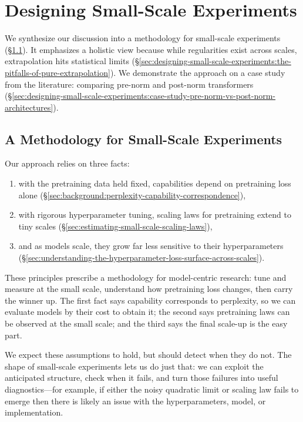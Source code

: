 \section{Designing Small-Scale Experiments}
\label{sec:designing-small-scale-experiments}

We synthesize our discussion into a methodology for small-scale experiments (\S\ref{sec:designing-small-scale-experiments:a-methodology-for-small-scale-experiments}). It emphasizes a holistic view because while regularities exist across scales, extrapolation hits statistical limits (\S\ref{sec:designing-small-scale-experiments:the-pitfalls-of-pure-extrapolation}). We demonstrate the approach on a case study from the literature: comparing pre-norm and post-norm transformers (\S\ref{sec:designing-small-scale-experiments:case-study-pre-norm-vs-post-norm-architectures}).

\subsection{A Methodology for Small-Scale Experiments}
\label{sec:designing-small-scale-experiments:a-methodology-for-small-scale-experiments}

Our approach relies on three facts:
%
\begin{enumerate}[noitemsep]
    \item with the pretraining data held fixed, capabilities depend on pretraining loss alone (\S\ref{sec:background:perplexity-capability-correspondence}),
    \item with rigorous hyperparameter tuning, scaling laws for pretraining extend to tiny scales (\S\ref{sec:estimating-small-scale-scaling-laws}),
    \item and as models scale, they grow far less sensitive to their hyperparameters (\S\ref{sec:understanding-the-hyperparameter-loss-surface-across-scales}).
\end{enumerate}
%
These principles prescribe a methodology for model-centric research: tune and measure at the small scale, understand how pretraining loss changes, then carry the winner up. The first fact says capability corresponds to perplexity, so we can evaluate models by their cost to obtain it; the second says pretraining laws can be observed at the small scale; and the third says the final scale-up is the easy part.

We expect these assumptions to hold, but should detect when they do not. The shape of small-scale experiments lets us do just that: we can exploit the anticipated structure, check when it fails, and turn those failures into useful diagnostics---for example, if either the noisy quadratic limit or scaling law fails to emerge then there is likely an issue with the hyperparameters, model, or implementation.

